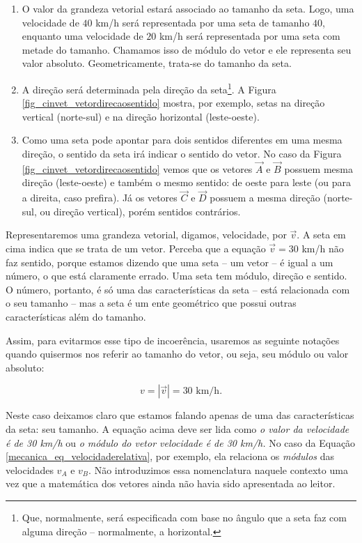 \begin{enumerate}
    \item [(i)] O valor da grandeza vetorial estará associado ao tamanho da seta. Logo, uma velocidade de $40$ km/h será representada por uma seta de tamanho $40$, enquanto uma velocidade de $20$ km/h será representada por uma seta com metade do tamanho. Chamamos isso de módulo do vetor e ele representa seu valor absoluto. Geometricamente, trata-se do tamanho da seta.
    \item [(ii)] A direção será determinada pela direção da seta\footnote{Que, normalmente, será especificada com base no ângulo que a seta faz com alguma direção -- normalmente, a horizontal.}. A Figura \ref{fig_cinvet_vetordirecaosentido} mostra, por exemplo, setas na direção vertical (norte-sul) e na direção horizontal (leste-oeste).
    \item [(iii)] Como uma seta pode apontar para dois sentidos diferentes em uma mesma direção, o sentido da seta irá indicar o sentido do vetor. No caso da Figura \ref{fig_cinvet_vetordirecaosentido} vemos que os vetores $\vec{A}$ e $\vec{B}$ possuem mesma direção (leste-oeste) e também o mesmo sentido: de oeste para leste (ou para a direita, caso prefira). Já os vetores $\vec{C}$ e $\vec{D}$ possuem a mesma direção (norte-sul, ou direção vertical), porém sentidos contrários.
\end{enumerate}







Representaremos uma grandeza vetorial, digamos, velocidade, por $\vec{v}.$ A seta em cima indica que se trata de um vetor. Perceba que a equação $\vec{v}=30$ km/h não faz sentido, porque estamos dizendo que uma seta -- um vetor -- é igual a um número, o que está claramente errado. Uma seta tem módulo, direção e sentido. O número, portanto, é só uma das características da seta -- está relacionada com o seu tamanho -- mas a seta é um ente geométrico que possui outras características além do tamanho.

Assim, para evitarmos esse tipo de incoerência, usaremos as seguinte notações quando quisermos nos referir ao tamanho do vetor, ou seja, seu módulo ou valor absoluto:

$$ v = |\vec{v}| = 30 \text{ km/h}.$$

Neste caso deixamos claro que estamos falando apenas de uma das características da seta: seu tamanho. A equação acima deve ser lida como \textit{o valor da velocidade é de 30 km/h} ou \textit{o módulo do vetor velocidade é de 30 km/h.} No caso da Equação \eqref{mecanica_eq_velocidaderelativa}, por exemplo, ela relaciona os \emph{módulos} das velocidades $v_A$ e $v_B$. Não introduzimos essa nomenclatura naquele contexto uma vez que a matemática dos vetores ainda não havia sido apresentada ao leitor.


